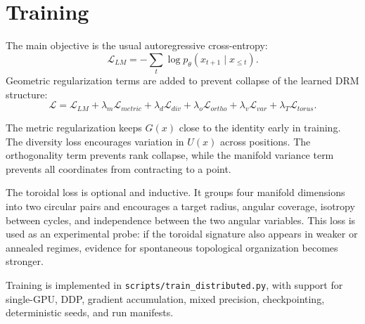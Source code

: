 \section{Training}
\label{sec:training}

The main objective is the usual autoregressive cross-entropy:
\begin{equation}
  \mathcal{L}_{LM}
  = - \sum_t \log p_\theta(x_{t+1}\mid x_{\leq t}).
\end{equation}
Geometric regularization terms are added to prevent collapse of the learned DRM
structure:
\begin{equation}
  \mathcal{L}
  =
  \mathcal{L}_{LM}
  + \lambda_m \mathcal{L}_{metric}
  + \lambda_d \mathcal{L}_{div}
  + \lambda_o \mathcal{L}_{ortho}
  + \lambda_v \mathcal{L}_{var}
  + \lambda_T \mathcal{L}_{torus}.
\end{equation}

The metric regularization keeps $G(x)$ close to the identity early in training.
The diversity loss encourages variation in $U(x)$ across positions. The
orthogonality term prevents rank collapse, while the manifold variance term
prevents all coordinates from contracting to a point.

The toroidal loss is optional and inductive. It groups four manifold dimensions
into two circular pairs and encourages a target radius, angular coverage,
isotropy between cycles, and independence between the two angular variables.
This loss is used as an experimental probe: if the toroidal signature also
appears in weaker or annealed regimes, evidence for spontaneous topological
organization becomes stronger.

Training is implemented in \texttt{scripts/train\_distributed.py}, with support
for single-GPU, DDP, gradient accumulation, mixed precision, checkpointing,
deterministic seeds, and run manifests.
